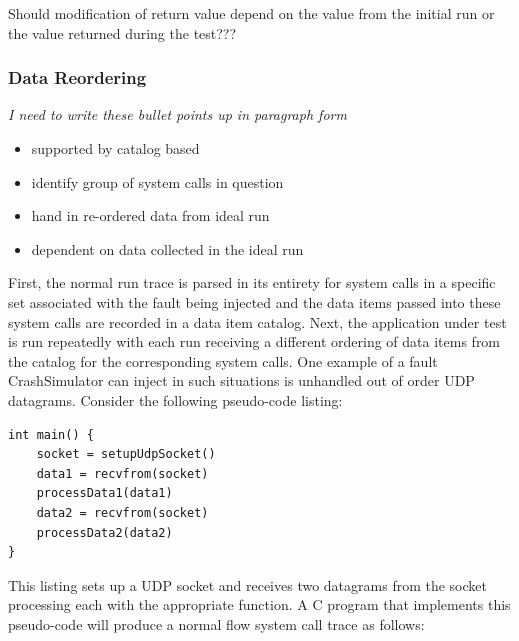             Should modification of return value depend on the value from the initial run or the value returned during
            the test???

        \subsubsection{Data Reordering}

        \emph{I need to write these bullet points up in paragraph form}
        \begin{itemize}
            \item{supported by catalog based}
            \item{identify group of system calls in question}
            \item{hand in re-ordered data from ideal run}
            \item{dependent on data collected in the ideal run}
        \end{itemize}


            First, the normal run trace is parsed in its entirety for system calls in a specific set
            associated with the fault being injected and the data items passed into these system calls are recorded in a
            data item catalog. Next, the application under test is run repeatedly with each run receiving a different
            ordering of data items from the catalog for the corresponding system calls. One example of a fault
            CrashSimulator can inject in such situations is unhandled out of order UDP datagrams. Consider the following
            pseudo-code listing:

            \begin{verbatim}
int main() {
    socket = setupUdpSocket()
    data1 = recvfrom(socket)
    processData1(data1)
    data2 = recvfrom(socket)
    processData2(data2)
}
            \end{verbatim}

            This listing sets up a UDP socket and receives two datagrams from the socket processing each with the
            appropriate function. A C program that implements this pseudo-code will produce a normal flow system call trace
            as follows:

